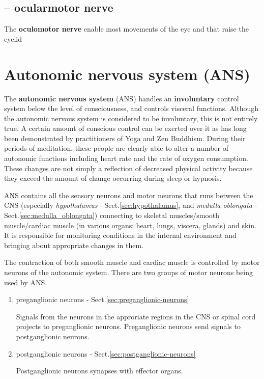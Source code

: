 \subsection{-- ocularmotor nerve}
\label{sec:ocularmotor-nerve}

The {\bf oculomotor nerve} enable most movements of the eye and that raise the
eyelid

\section{Autonomic nervous system (ANS)}
\label{sec:autonomic_nervous_system}

The {\bf autonomic nervous system} (ANS) handles an {\bf involuntary} control
system below the level of consciousness, and controls visceral functions.
Although the autonomic nervous system is considered to be involuntary, this is
not entirely true. A certain amount of conscious control can be exerted over it
as has long been demonstrated by practitioners of Yoga and Zen Buddhism.
During their periods of meditation, these people are clearly able to alter a
number of autonomic functions including heart rate and the rate of oxygen
consumption. These changes are not simply a reflection of decreased physical
activity because they exceed the amount of change occurring during sleep or
hypnosis.   

ANS contains all the sensory neurons and motor neurons that runs between the CNS
(especially {\it hypothalamus} - Sect.\ref{sec:hypothalamus}, and {\it medulla
oblongata} - Sect.\ref{sec:medulla_oblongata}) connecting to skeletal
muscles/smooth muscle/cardiac muscle (in various organs: heart, lungs, viscera,
glands) and skin. It is responsible for monitoring conditions in the internal
environment and bringing about appropriate changes in them.

The contraction of both smooth muscle and cardiac muscle is controlled by motor
neurons of the autonomic system. There are two groups of motor neurons being
used by ANS.
\begin{enumerate}
  \item preganglionic neurons - Sect.\ref{sec:preganglionic-neurons}
  
Signals from the neurons in the approriate regions in the CNS or spinal cord
projects to preganglionic neurons. Preganglionic neurons send signals to postganglionic
neurons.


  \item postganglionic neurons - Sect.\ref{sec:postganglionic-neurons} 
  
Postganglionic neurons synapses with effector organs.
\end{enumerate}

